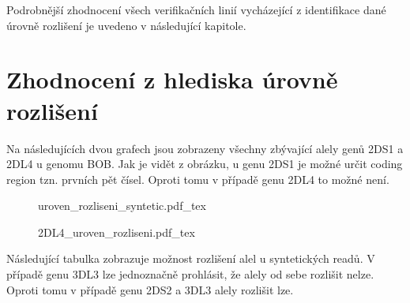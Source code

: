 \documentclass[czech,DP]{thesiskiv}
\numberwithin{equation}{section}
\begin{document}
\noindent 
Podrobnější zhodnocení všech verifikačních linií vycházející z identifikace dané úrovně rozlišení je uvedeno v následující kapitole.


\chapter{Zhodnocení z hlediska úrovně rozlišení}
Na následujících dvou grafech jsou zobrazeny všechny zbývající alely genů 2DS1 a 2DL4 u genomu BOB. Jak je vidět z obrázku, u genu 2DS1 je možné určit coding region tzn. prvních pět čísel. Oproti tomu v případě genu 2DL4 to možné není. 


\begin{figure}[H]
	\centering
    \def\svgwidth{\columnwidth}
    {uroven_rozliseni_syntetic.pdf_tex} 
\end{figure}

\begin{figure}[H]
	\centering
    \def\svgwidth{\columnwidth}
    {2DL4_uroven_rozliseni.pdf_tex} 
\end{figure}

\noindent
Následující tabulka zobrazuje možnost rozlišení alel u syntetických readů. V případě genu 3DL3 lze jednoznačně prohlásit, že alely od sebe rozlišit nelze. Oproti tomu v případě genu 2DS2 a 3DL3 alely rozlišit lze. 
\end{document}
